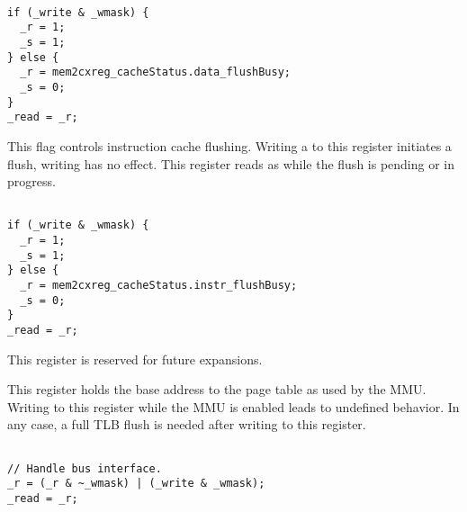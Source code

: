 \declaration{}
\implementation{}
\begin{lstlisting}

if (_write & _wmask) {
  _r = 1;
  _s = 1;
} else {
  _r = mem2cxreg_cacheStatus.data_flushBusy;
  _s = 0;
}
_read = _r;

\end{lstlisting}

This flag controls instruction cache flushing. Writing a  to this 
register initiates a flush, writing  has no effect. This register reads 
as  while the flush is pending or in progress.

\declaration{}
\implementation{}
\begin{lstlisting}

if (_write & _wmask) {
  _r = 1;
  _s = 1;
} else {
  _r = mem2cxreg_cacheStatus.instr_flushBusy;
  _s = 0;
}
_read = _r;

\end{lstlisting}


This register is reserved for future expansions.


This register holds the base address to the page table as used by the MMU.
Writing to this register while the MMU is enabled leads to undefined behavior.
In any case, a full TLB flush is needed after writing to this register.

\declaration{}
\implementation{}
\begin{lstlisting}

// Handle bus interface.
_r = (_r & ~_wmask) | (_write & _wmask);
_read = _r;

\end{lstlisting}

